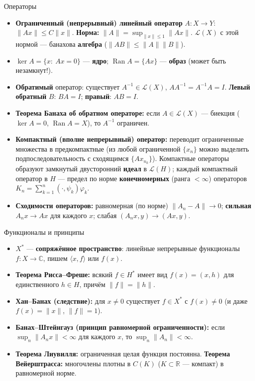 \documentclass[11pt,a4paper]{article}
\newcommand{\Lc}{\mathcal L}
\newcommand{\CC}{\mathbb C}
\newcommand{\RR}{\mathbb R}
\newcommand{\Ran}{\operatorname{Ran}}
\begin{document}
\begin{base}{Операторы}
\begin{itemize}
\item \textbf{Ограниченный (непрерывный) линейный оператор} $A:X\to Y$: $\|Ax\|\le C\|x\|$. \textbf{Норма:} $\|A\|=\sup_{\|x\|\le1}\|Ax\|$. $\Lc(X)$ с этой нормой — банахова \textbf{алгебра} ($\|AB\|\le\|A\|\|B\|$).
\item $\ker A=\{x:\ Ax=0\}$ — \textbf{ядро}; $\Ran A=\{Ax\}$ — \textbf{образ} (может быть незамкнут!).
\item \textbf{Обратимый} оператор: существует $A^{-1}\in\Lc(X)$, $AA^{-1}=A^{-1}A=I$. \textbf{Левый обратный} $B$: $BA=I$; \textbf{правый}: $AB=I$.
\item \textbf{Теорема Банаха об обратном операторе:} если $A\in\Lc(X)$ — биекция ($\ker A=0$, $\Ran A=X$), то $A^{-1}$ ограничен.
\item \textbf{Компактный (вполне непрерывный) оператор:} переводит ограниченные множества в предкомпактные (из любой ограниченной $\{x_n\}$ можно выделить подпоследовательность с сходящимся $\{Ax_{n_k}\}$). Компактные операторы образуют замкнутый двусторонний \textbf{идеал} в $\Lc(H)$; каждый компактный оператор в $H$ — предел по норме \textbf{конечномерных} (ранга $<\infty$) операторов $K_n=\sum_{k=1}^n(\cdot,\psi_k)\varphi_k$.
\item \textbf{Сходимости операторов:} равномерная (по норме) $\|A_n-A\|\to0$; \textbf{сильная} $A_nx\to Ax$ для каждого $x$; слабая $(A_nx,y)\to(Ax,y)$.
\end{itemize}
\end{base}

\begin{base}{Функционалы и принципы}
\begin{itemize}
\item $X^*$ — \textbf{сопряжённое пространство}: линейные непрерывные функционалы $f:X\to\CC$, пишем $\langle x,f\rangle$ или $f(x)$.
\item \textbf{Теорема Рисса–Фреше:} всякий $f\in H^*$ имеет вид $f(x)=(x,h)$ для единственного $h\in H$, причём $\|f\|=\|h\|$.
\item \textbf{Хан–Банах (следствие):} для $x\ne0$ существует $f\in X^*$ с $f(x)\ne0$ (и даже $f(x)=\|x\|$, $\|f\|=1$).
\item \textbf{Банах–Штейнгауз (принцип равномерной ограниченности):} если $\sup_n\|A_nx\|<\infty$ для каждого $x$, то $\sup_n\|A_n\|<\infty$.
\item \textbf{Теорема Лиувилля:} ограниченная целая функция постоянна. \textbf{Теорема Вейерштрасса:} многочлены плотны в $C(K)$ ($K\subset\RR$ — компакт) в равномерной норме.
\end{itemize}
\end{base}
\end{document}
